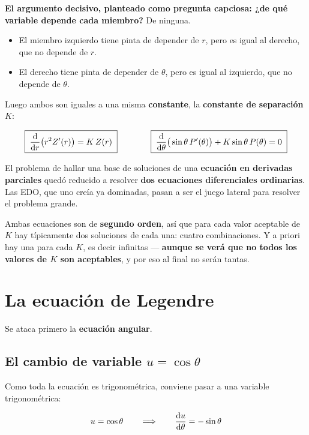 \documentclass[12pt,a4paper]{article}
\begin{document}
\textbf{El argumento decisivo, planteado como pregunta capciosa: ¿de qué variable
depende cada miembro?} De ninguna.

\begin{itemize}[leftmargin=*]
  \item El miembro izquierdo tiene pinta de depender de $r$, pero es igual al
        derecho, que no depende de $r$.
  \item El derecho tiene pinta de depender de $\theta$, pero es igual al
        izquierdo, que no depende de $\theta$.
\end{itemize}

Luego ambos son iguales a una misma \textbf{constante}, la \textbf{constante de
separación} $K$:

\[
\boxed{\;\dv{r}\big(r^2 Z'(r)\big) = K\,Z(r)\;}
\qquad\qquad
\boxed{\;\dv{\theta}\big(\sin\theta\,P'(\theta)\big) + K\sin\theta\,P(\theta) = 0\;}
\]

\begin{keybox}
El problema de hallar una base de soluciones de una \textbf{ecuación en derivadas
parciales} quedó reducido a resolver \textbf{dos ecuaciones diferenciales
ordinarias}. Las EDO, que uno creía ya dominadas, pasan a ser el juego lateral
para resolver el problema grande.
\end{keybox}

Ambas ecuaciones son de \textbf{segundo orden}, así que para cada valor aceptable
de $K$ hay típicamente dos soluciones de cada una: cuatro combinaciones. Y a
priori hay una para cada $K$, es decir infinitas --- \textbf{aunque se verá que no
todos los valores de $K$ son aceptables}, y por eso al final no serán tantas.

\section{La ecuación de Legendre}

Se ataca primero la \textbf{ecuación angular}.

\subsection{El cambio de variable \texorpdfstring{$u = \cos\theta$}{u = cos theta}}

Como toda la ecuación es trigonométrica, conviene pasar a una variable
trigonométrica:

\[
u = \cos\theta \qquad\Longrightarrow\qquad \dv{u}{\theta} = -\sin\theta
\]
\end{document}
